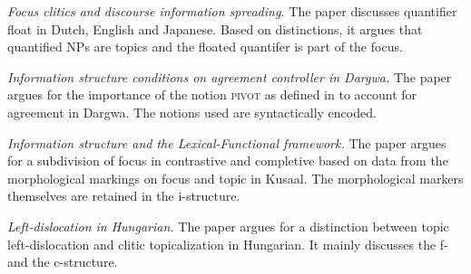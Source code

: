 \documentclass[output=paper,hidelinks]{langscibook}
\begin{document}
\vspace{+6pt}
\citet{Otoguro16} \textit{Focus clitics and discourse information spreading.} The paper discusses quantifier float in Dutch, English and Japanese. Based on  distinctions, it argues that quantified NPs are topics and the floated quantifer is part of the focus. 

\vspace{+6pt}
\citet{Belyaev} \textit{Information structure conditions on agreement controller in Darg\-wa.} The paper argues for the importance of the notion \textsc{pivot} as defined in \citet{falk06} to account for agreement in Dargwa. The notions used are syntactically encoded.


\vspace{+6pt}
\citet{Abubakari} \textit{Information structure and the Lexical-Functional framework. }The paper argues for a subdivision of focus in contrastive and completive based on data from the morphological markings on focus and topic in Kusaal. The morphological markers themselves are retained in the i-structure.  

\vspace{+6pt} 
\citet{Szucs2019} \textit{Left-dislocation in Hungarian.} The paper argues for a distinction between topic left-dislocation and clitic topicalization in Hungarian. It mainly discusses the f- and the c-structure.
\end{document}
